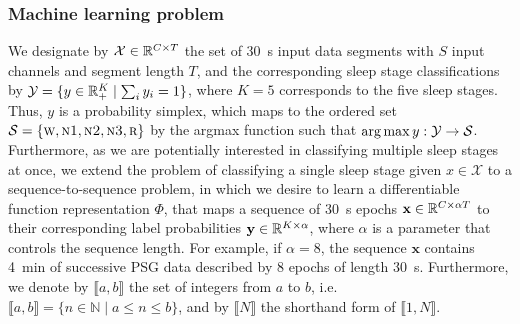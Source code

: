 \subsubsection{Machine learning problem}
We designate by $\mathcal{X} \in \mathbb{R}^{C \times T}$ the set of \SI{30}{\second} input data segments with $S$ input channels and segment length $T$, and the corresponding sleep stage classifications by $\mathcal{Y} = \lbrace y \in \mathbb{R}^{K}_{+} \mid \sum_i y_i = 1 \rbrace$, where $K = 5$ corresponds to the five sleep stages.
Thus, $y$ is a probability simplex, which maps to the ordered set $\mathcal{S} = \lbrace \textsc{w}, \textsc{n1}, \textsc{n2}, \textsc{n3}, \textsc{r} \rbrace$ by the argmax function such that $\operatorname*{arg\,max}{y : \mathcal{Y} \to \mathcal{S}}$.
Furthermore, as we are potentially interested in classifying multiple sleep stages at once, we extend the problem of classifying a single sleep stage given $x \in \mathcal{X}$ to a sequence-to-sequence problem, in which we desire to learn a differentiable function representation $\Phi$, that maps a sequence of \SI{30}{\second} epochs $\mathbf{x} \in \mathbb{R}^{C \times \alpha T}$ to their corresponding label probabilities $\mathbf{y} \in \mathbb{R}^{K \times \alpha}$, where $\alpha$ is a parameter that controls the sequence length. 
For example, if $\alpha=8$, the sequence $\mathbf{x}$ contains \SI{4}{\minute} of successive \ac{PSG} data described by 8 epochs of length \SI{30}{\second}.
Furthermore, we denote by $\llbracket a, b \rrbracket$ the set of integers from $a$ to $b$, i.e. $\llbracket a, b \rrbracket = \lbrace n \in \mathbb{N} \mid a \leq n \leq b \rbrace$, and by $\llbracket N \rrbracket$ the shorthand form of $\llbracket 1, N \rrbracket$.


